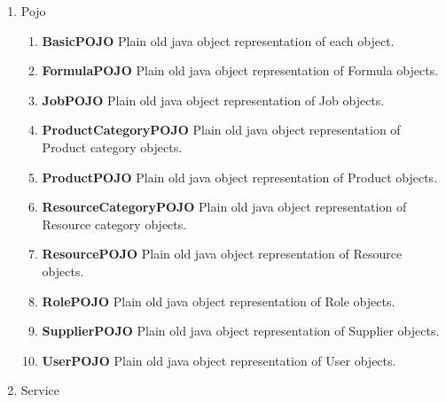 \documentclass[a4paper,11pt,twoside]{report}
\theoremstyle{definition}
\begin{document}
\begin{enumerate}
\begin{enumerate}
\end{enumerate} 
\item Pojo 
\begin{enumerate} 
\item \textbf{BasicPOJO} Plain old java object representation of each object.
\item \textbf{FormulaPOJO} Plain old java object representation of Formula objects.
\item \textbf{JobPOJO} Plain old java object representation of Job objects.
\item \textbf{ProductCategoryPOJO} Plain old java object representation of Product category objects.
\item \textbf{ProductPOJO} Plain old java object representation of Product objects.
\item \textbf{ResourceCategoryPOJO} Plain old java object representation of Resource category objects.

\item \textbf{ResourcePOJO} Plain old java object representation of Resource objects.

\item \textbf{RolePOJO} Plain old java object representation of Role objects.
\item \textbf{SupplierPOJO} Plain old java object representation of Supplier objects.
\item \textbf{UserPOJO} Plain old java object representation of User objects.

\end{enumerate} 
\item Service 
\begin{enumerate} 


\end{enumerate}
\end{enumerate}
\end{document}
